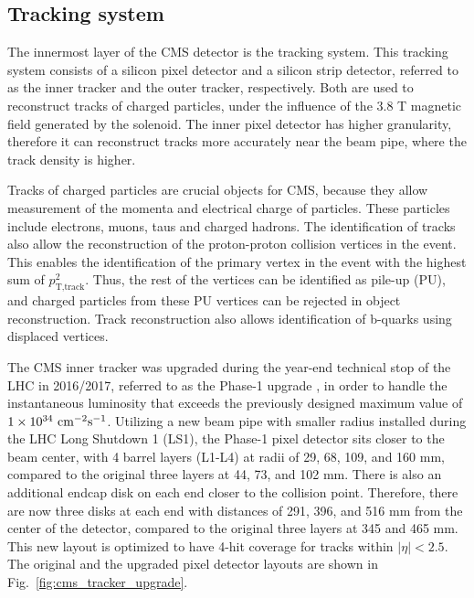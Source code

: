 \subsection{Tracking system}

The innermost layer of the CMS detector is the tracking system. This tracking system consists of a silicon pixel detector and a silicon strip detector, 
referred to as the inner tracker and the outer tracker, respectively. Both are used to reconstruct tracks of charged particles, under the influence of
the 3.8 T magnetic field generated by the solenoid. The inner pixel detector has higher granularity, therefore it can reconstruct tracks more accurately near
the beam pipe, where the track density is higher.

Tracks of charged particles are crucial objects for CMS, because they allow measurement of the momenta and electrical charge of particles. These particles include
electrons, muons, taus and charged hadrons. The identification of tracks also allow the reconstruction of the proton-proton collision vertices in the event. This enables
the identification of the primary vertex in the event with the highest sum of $p_{\textrm{T,track}}^{2}$. Thus, the rest of the vertices can be identified as pile-up (PU),
and charged particles from these PU vertices can be rejected in object reconstruction. Track reconstruction also allows identification of b-quarks using displaced
vertices. 

The CMS inner tracker was upgraded during the year-end technical stop of the LHC in 2016/2017, referred to as the Phase-1 upgrade \cite{cms:tracker_upgrade},
in order to handle the instantaneous luminosity that exceeds the previously designed maximum value of $1 \times 10^{34} \ \lumiunit$. Utilizing a new 
beam pipe with smaller radius installed during the LHC Long Shutdown 1 (LS1), the Phase-1 pixel detector sits closer to the beam center, with 4 barrel layers 
(L1-L4) at radii of 29, 68, 109, and 160 mm, compared to the original three layers at 44, 73, and 102 mm. There is also an additional endcap disk on each end 
closer to the collision point. Therefore, there are now three disks at each end with distances of 291, 396, and 516 mm from the center of the detector, compared 
to the original three layers at 345 and 465 mm. This new layout is optimized to have 4-hit coverage for tracks within $|\eta| < 2.5$. The original and the upgraded
pixel detector layouts are shown in Fig.~\ref{fig:cms_tracker_upgrade}.

